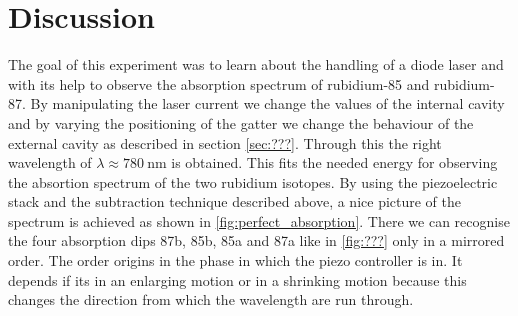 \section{Discussion}
\label{sec:Diskussion}

The goal of this experiment was to learn about the handling of a diode laser and with its help to observe the absorption spectrum of rubidium-85 and rubidium-87.
By manipulating the laser current we change the values of the internal cavity and by varying the positioning of the gatter we change the behaviour of the external cavity as described in section \ref{sec:???}. Through this the right wavelength of $\lambda \approx \SI{780}{\nano\meter}$ is obtained. This fits the needed energy for observing the absortion spectrum of the two rubidium isotopes. By using the piezoelectric stack and the subtraction technique described above, a nice picture of the spectrum is achieved as shown in \ref{fig:perfect_absorption}. There we can recognise the four absorption dips 87b, 85b, 85a and 87a like in \ref{fig:???} only in a mirrored order. The order origins in the phase in which the piezo controller is in. It depends if its in an enlarging motion or in a shrinking motion because this changes the direction from which the wavelength are run through.
